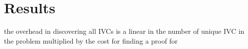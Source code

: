 \section{Results}
\label{sec:results}

\newcommand{\takeaway}[1]{
\vspace{6pt}
\noindent\fbox{\parbox{0.975\columnwidth}{#1}}
\vspace{6pt}
}
 the overhead
in discovering all IVCs is a linear in the number of unique IVC
in the problem multiplied by the cost for finding a proof for
%
%
%
%
%
%
%
%
